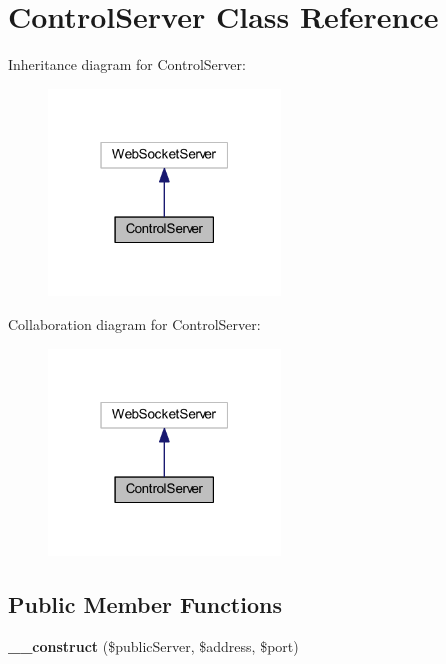 \section{Control\+Server Class Reference}
\label{class_lora_1_1_api_1_1_control_server}


Inheritance diagram for Control\+Server\+:\nopagebreak
\begin{figure}[H]
\begin{center}
\leavevmode
\includegraphics[width=175pt]{class_lora_1_1_api_1_1_control_server__inherit__graph}
\end{center}
\end{figure}


Collaboration diagram for Control\+Server\+:\nopagebreak
\begin{figure}[H]
\begin{center}
\leavevmode
\includegraphics[width=175pt]{class_lora_1_1_api_1_1_control_server__coll__graph}
\end{center}
\end{figure}
\subsection*{Public Member Functions}
\begin{DoxyCompactItemize}
\item 
\mbox{\label{class_lora_1_1_api_1_1_control_server_a038654e8959a00da1dcaab1789a8a73f}} 
{\bfseries \+\_\+\+\_\+construct} (\$public\+Server, \$address, \$port)
\end{DoxyCompactItemize}
